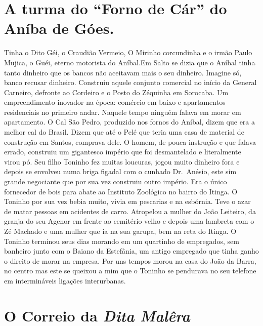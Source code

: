 \documentclass[12pt,brazil,]{book}
\begin{document}
\section{\texorpdfstring{A turma do ``Forno de Cár'' do Aníba de
Góes.}{A turma do Forno de Cár do Aníba de Góes.}}\label{a-turma-do-forno-de-cuxe1r-do-anuxedba-de-guxf3es.}

Tinha o Dito Géi, o Craudião Vermeio, O Mirinho corcundinha e o irmão
Paulo Mujica, o Guéi, eterno motorista do Aníbal.Em Salto se dizia que o
Aníbal tinha tanto dinheiro que os bancos não aceitavam mais o seu
dinheiro. Imagine só, banco recusar dinheiro. Construiu aquele conjunto
comercial no início da General Carneiro, defronte ao Cordeiro e o Posto
do Zéquinha em Sorocaba. Um empreendimento inovador na época: comércio
em baixo e apartamentos residenciais no primeiro andar. Naquele tempo
ninguém falava em morar em apartamento. O Cal São Pedro, produzido nos
fornos do Aníbal, dizem que era a melhor cal do Brasil. Dizem que até o
Pelé que teria uma casa de material de construção em Santos, comprava
dele. O homem, de pouca instrução e que falava errado, construiu um
gigantesco império que foi desmantelado e literalmente virou pó. Seu
filho Toninho fez muitas loucuras, jogou muito dinheiro fora e depois se
envolveu numa briga figadal com o cunhado Dr.~Anésio, este sim grande
negociante que por sua vez construiu outro império. Era o único
fornecedor de bois para abate ao Instituto Zoológico no bairro do
Itinga. O Toninho por sua vez bebia muito, vivia em pescarias e na
esbórnia. Teve o azar de matar pessoas em acidentes de carro. Atropelou
a mulher do João Leiteiro, da granja do seu Agenor em frente ao
cemitério velho e depois uma lambreta com o Zé Machado e uma mulher que
ia na sua garupa, bem na reta do Itinga. O Toninho terminou seus dias
morando em um quartinho de empregados, sem banheiro junto com o Baiano
da Estefânia, um antigo empregado que tinha ganho o direito de morar na
empresa. Por uns tempos morou na casa do João da Barra, no centro mas
este se queixou a mim que o Toninho se pendurava no seu telefone em
intermináveis ligações interurbanas.

\section{\texorpdfstring{O Correio da \emph{Dita
Malêra}}{O Correio da Dita Malêra}}\label{o-correio-da-dita-maluxeara}
\end{document}
